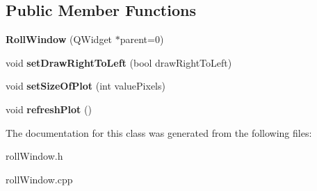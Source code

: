 \subsection*{Public Member Functions}
\begin{DoxyCompactItemize}
\item 
\mbox{\label{class_roll_window_a13bf8ce2de16e459b4d55700d00ff60a}} 
{\bfseries Roll\+Window} (Q\+Widget $\ast$parent=0)
\item 
\mbox{\label{class_roll_window_ab3ef8e3836b153b590422bf79d6c0cef}} 
void {\bfseries set\+Draw\+Right\+To\+Left} (bool draw\+Right\+To\+Left)
\item 
\mbox{\label{class_roll_window_a20a2169e2aab419fb403fc9285a1e35a}} 
void {\bfseries set\+Size\+Of\+Plot} (int value\+Pixels)
\item 
\mbox{\label{class_roll_window_a2ab5bd32d885dfa84389e346753f04cc}} 
void {\bfseries refresh\+Plot} ()
\end{DoxyCompactItemize}


The documentation for this class was generated from the following files\+:\begin{DoxyCompactItemize}
\item 
roll\+Window.\+h\item 
roll\+Window.\+cpp\end{DoxyCompactItemize}
